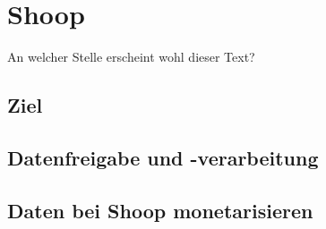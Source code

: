 \section{Shoop}
An welcher Stelle erscheint wohl dieser Text?
\subsection{Ziel}

\subsection{Datenfreigabe und -verarbeitung}

\subsection{Daten bei Shoop monetarisieren}